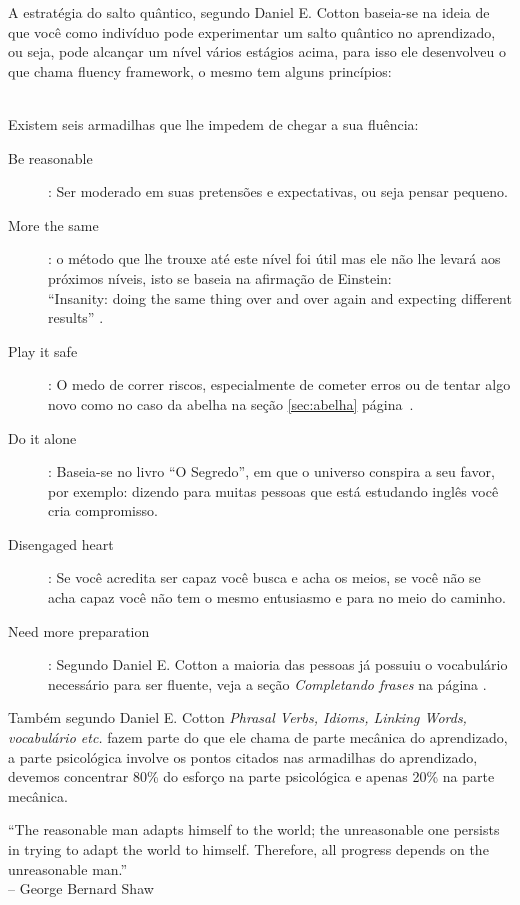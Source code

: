 A estratégia do salto quântico, segundo Daniel E. Cotton baseia-se
na ideia de que você como indivíduo pode experimentar um salto quântico
no aprendizado, ou seja, pode alcançar um nível vários estágios acima, para
isso ele desenvolveu o que chama fluency framework, o mesmo tem alguns princípios:

\vspace{0.3\baselineskip}
 \\
Existem seis armadilhas que lhe impedem de chegar a sua fluência:
\begin{description}
	\item [Be reasonable]: Ser moderado em suas pretensões e expectativas, ou seja pensar pequeno.
		\item [More the same]: o método que lhe trouxe até este nível foi útil mas ele não lhe levará aos próximos níveis,
			isto se baseia na afirmação de Einstein:\\ {\footnotesize {} ``Insanity: doing the same thing over and over again and expecting different results'' }.
		\item [Play it safe]: O medo de correr riscos, especialmente de cometer erros ou de tentar algo novo como
			no caso da abelha na seção \ref{sec:abelha} página~\pageref{sec:abelha}.
		\item [Do it alone]: Baseia-se no livro ``O Segredo'', em que o universo conspira a seu favor, por exemplo:
			dizendo para muitas pessoas que está estudando inglês você cria compromisso.
		\item [Disengaged heart]: Se você acredita ser capaz você busca e acha os meios, se você não se acha capaz
			você não tem o mesmo entusiasmo e para no meio do caminho.
		\item [ Need more preparation]: Segundo Daniel E. Cotton a maioria das pessoas já possuiu
			o vocabulário necessário para ser fluente, veja a seção {\em Completando frases} na página \pageref{sub:frases}.
\end{description}

\noindent
Também segundo Daniel E. Cotton {\em Phrasal Verbs, Idioms, Linking Words, vocabulário etc.} fazem parte do que ele chama
de parte mecânica do aprendizado, a parte psicológica involve os pontos citados nas armadilhas do aprendizado, devemos concentrar
80\% do esforço na parte psicológica e apenas 20\% na parte mecânica.

\vspace{0.3\baselineskip}
{\footnotesize {} ``The reasonable man adapts himself to the world; the unreasonable one persists
in trying to adapt the world to himself.
Therefore, all progress depends on the unreasonable man.'' \\
                                 -- George Bernard Shaw}

